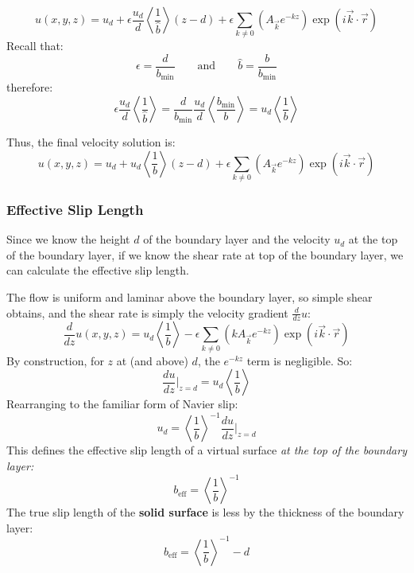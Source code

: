 \documentclass[a4paper]{report}
\newcommand{\beff}{\ensuremath{b_{\mathrm{eff}}}}
\newcommand{\bmin}{\ensuremath{b_{\mathrm{min}}}}
\begin{document}
\begin{equation}
u(x,y,z) = u_d
 + \epsilon \frac{u_d}{d} \left< \frac{1}{\hat{b}} \right> (z - d)
 +  \epsilon \sum_{k \neq 0} 
\left(  A_{\vec{k}} e^{-kz} \right)
\exp(i \vec{k}\cdot \vec{r})
\end{equation}
Recall that:
\begin{equation}
\epsilon = \frac{d}{\bmin} \qquad \text{and} \qquad
\hat{b} = \frac{b}{\bmin}
\end{equation}
therefore:
\begin{equation}
\epsilon \frac{u_d}{d} \left< \frac{1}{\hat{b}} \right> 
= \frac{d}{\bmin} \frac{u_d}{d} \left< \frac{\bmin}{b} \right> 
= u_d \left< \frac{1}{b} \right>
\end{equation}

Thus, the final velocity solution is:
\begin{equation}
u(x,y,z) = u_d
 + u_d\left< \frac{1}{b} \right> (z - d)
 +  \epsilon \sum_{k \neq 0} 
\left(  A_{\vec{k}} e^{-kz} \right)
\exp(i \vec{k}\cdot \vec{r})
\end{equation}

\subsubsection*{Effective Slip Length}

Since we know the height $d$ of the boundary layer and the velocity $u_d$ at the top of the boundary layer, if we know the shear rate at top of the boundary layer, we can calculate the effective slip length.

The flow is uniform and laminar above the boundary layer, so simple shear obtains, and the shear rate is simply the velocity gradient $\frac{d}{dz} u$:
\begin{equation}
\frac{d}{dz} u(x,y,z) = 
 u_d\left< \frac{1}{b} \right>
 - \epsilon \sum_{k \neq 0} 
\left( k A_{\vec{k}} e^{-kz} \right)
\exp(i \vec{k}\cdot \vec{r})
\end{equation}
By construction, for $z$ at (and above) $d$, the $e^{-kz}$ term is negligible. So:
\begin{equation}
\frac{du}{dz} \rvert_{z=d} = u_d\left< \frac{1}{b} \right>
\end{equation}
Rearranging to the familiar form of Navier slip:
\begin{equation}
 u_d = \left< \frac{1}{b} \right>^{-1} \frac{du}{dz} \rvert_{z=d}
\end{equation}
This defines the effective slip length of a virtual surface \emph{at the top of the boundary layer:}
\begin{equation}
\beff = \left< \frac{1}{b} \right>^{-1}
\end{equation}
The true slip length of the \textbf{solid surface} is less by the thickness of the boundary layer:
\begin{equation}
\beff = \left< \frac{1}{b} \right>^{-1} - d
\end{equation}
\end{document}
